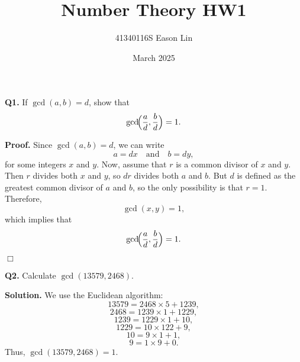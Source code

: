 \documentclass{article}
\title{Number Theory HW1}
\author{41340116S Eason Lin}
\date{March 2025}
\begin{document}
\maketitle

\textbf{Q1.} If $\gcd(a, b) = d$, show that 
\[
\gcd\!\Bigl(\frac{a}{d}, \frac{b}{d}\Bigr) = 1.
\]

\textbf{Proof.} Since $\gcd(a, b) = d$, we can write
\[
a = d x \quad \text{and} \quad b = d y,
\]
for some integers $x$ and $y$. Now, assume that $r$ is a common divisor of $x$ and $y$. Then $r$ divides both $x$ and $y$, so $dr$ divides both $a$ and $b$. But $d$ is defined as the greatest common divisor of $a$ and $b$, so the only possibility is that $r = 1$. Therefore,
\[
\gcd(x, y) = 1,
\]
which implies that
\[
\gcd\!\Bigl(\frac{a}{d}, \frac{b}{d}\Bigr) = 1.
\]

\hfill$\Box$

\bigskip

\textbf{Q2.} Calculate $\gcd(13579, 2468).$

\textbf{Solution.} We use the Euclidean algorithm:
\[
13579 = 2468 \times 5 + 1239,
\]
\[
2468 = 1239 \times 1 + 1229,
\]
\[
1239 = 1229 \times 1 + 10,
\]
\[
1229 = 10 \times 122 + 9,
\]
\[
10 = 9 \times 1 + 1,
\]
\[
9 = 1 \times 9 + 0.
\]
Thus, $\gcd(13579, 2468) = 1$.
\end{document}
